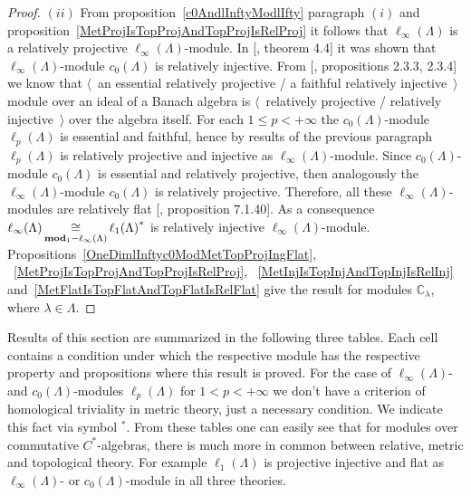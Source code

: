 \begin{proof}
$(ii)$ From proposition~\ref{c0AndlInftyModlIfty} paragraph $(i)$ and
proposition~\ref{MetProjIsTopProjAndTopProjIsRelProj} it follows that
$\ell_\infty(\Lambda)$ is a relatively projective $\ell_\infty(\Lambda)$-module. 
In [\cite{NemANoteOnRelInjC0ModC0}, theorem 4.4] it was shown 
that $\ell_\infty(\Lambda)$-module $c_0(\Lambda)$ is relatively injective. 
From [\cite{RamsHomPropSemgroupAlg}, propositions 2.3.3, 2.3.4] we know that
$\langle$~an essential relatively projective / a  faithful relatively
injective~$\rangle$ module over an ideal of a Banach algebra is 
$\langle$~relatively projective / relatively injective~$\rangle$ over the algebra 
itself. For each $1\leq p<+\infty$ the $c_0(\Lambda)$-module $\ell_p(\Lambda)$  
is essential and faithful, hence by results of 
the previous paragraph $\ell_p(\Lambda)$ is relatively projective and
injective as $\ell_\infty(\Lambda)$-module. Since $c_0(\Lambda)$-module 
$c_0(\Lambda)$ is essential and relatively projective, then analogously 
the $\ell_\infty(\Lambda)$-module $c_0(\Lambda)$ is relatively projective. 
Therefore, all these $\ell_\infty(\Lambda)$-modules are relatively 
flat [\cite{HelBanLocConvAlg}, proposition 7.1.40]. As a consequence 
$\ell_\infty(\Lambda)\mathop{\mathbin{\cong}}\limits_{\mathbf{mod}_1-\ell_\infty(\Lambda)} {\ell_1(\Lambda)}^*$ 
is relatively injective $\ell_\infty(\Lambda)$-module.
Propositions~\ref{OneDimlInftyc0ModMetTopProjIngFlat},
~\ref{MetProjIsTopProjAndTopProjIsRelProj},
~\ref{MetInjIsTopInjAndTopInjIsRelInj}
and~\ref{MetFlatIsTopFlatAndTopFlatIsRelFlat} give the result for modules
$\mathbb{C}_\lambda$, where $\lambda\in\Lambda$.
\end{proof}

Results of this section are summarized in the following three tables. Each cell
contains a condition under which the respective module has the respective
property and propositions where this result is proved. For the case 
of $\ell_\infty(\Lambda)$- and $c_0(\Lambda)$-modules $\ell_p(\Lambda)$ 
for $1<p<+\infty$ we don't have a criterion of homological triviality in metric
theory, just a necessary condition. We indicate this fact via symbol ${}^*$.
From these tables one can easily see that for modules over commutative
$C^*$-algebras, there is much more in common between relative, metric and
topological  theory. For example $\ell_1(\Lambda)$ is projective injective and
flat as $\ell_\infty(\Lambda)$- or $c_0(\Lambda)$-module in all three theories.


